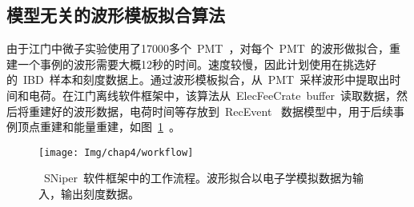 %
%
%
%
%



\subsection{模型无关的波形模板拟合算法}
由于江门中微子实验使用了17000多个~PMT~，对每个~PMT~的波形做拟合，重建一个事例的波形需要大概12秒的时间。速度较慢，因此计划使用在挑选好的~IBD~样本和刻度数据上。通过波形模板拟合，从~PMT~采样波形中提取出时间和电荷。在江门离线软件框架中，该算法从~ElecFeeCrate~buffer~读取数据，然后将重建好的波形数据，电荷时间等存放到~RecEvent~ 数据模型中，用于后续事例顶点重建和能量重建，如图~\ref{fig:workflow}~。
\begin{figure}[!htbp]
  \centering
   \texttt{[image: Img/chap4/workflow]}
    \caption{~SNiper~软件框架中的工作流程。波形拟合以电子学模拟数据为输入，输出刻度数据。}
  \label{fig:workflow}
\end{figure}
